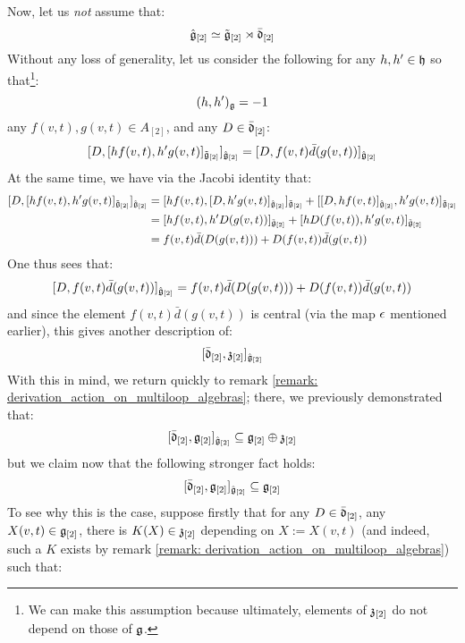 \begin{remark}
                Now, let us \textit{not} assume that:
                    $$\hat{\mathfrak{g}}_{[2]} \simeq \tilde{\mathfrak{g}}_{[2]}\rtimes \bar{\mathfrak{d}}_{[2]}$$
                Without any loss of generality, let us consider the following for any $h, h' \in \mathfrak{h}$ so that\footnote{We can make this assumption because ultimately, elements of $\mathfrak{z}_{[2]}$ do not depend on those of $\mathfrak{g}$.}:
                    $$(h, h')_{\mathfrak{g}} = -1$$
                any $f(v, t), g(v, t) \in A_{[2]}$, and any $D \in \bar{\mathfrak{d}}_{[2]}$:
                    $$[ D, [h f(v, t), h' g(v, t)]_{\tilde{\mathfrak{g}}_{[2]}} ]_{\hat{\mathfrak{g}}_{[2]}} = [ D, f(v, t) \bar{d}( g(v, t) ) ]_{\hat{\mathfrak{g}}_{[2]}}$$
                At the same time, we have via the Jacobi identity that:
                    $$
                        \begin{aligned}
                            [ D, [h f(v, t), h' g(v, t)]_{\tilde{\g}_{[2]}} ]_{\hat{\g}_{[2]}} & = [ h f(v, t), [D, h' g(v, t)]_{\hat{\g}_{[2]}} ]_{\tilde{\g}_{[2]}} + [ [D, h f(v, t)]_{\hat{\g}_{[2]}}, h' g(v, t) ]_{\tilde{\g}_{[2]}}
                            \\
                            & = [ h f(v, t), h' D( g(v, t) ) ]_{\tilde{\g}_{[2]}} + [ h D( f(v, t) ), h' g(v, t) ]_{\tilde{\g}_{[2]}}
                            \\
                            & = f(v, t) \bar{d}( D( g(v, t) ) ) + D( f(v, t) ) \bar{d}(g(v, t))
                        \end{aligned}
                    $$
                One thus sees that:
                    $$[ D, f(v, t) \bar{d}( g(v, t) ) ]_{\hat{\mathfrak{g}}_{[2]}} = f(v, t) \bar{d}( D( g(v, t) ) ) + D( f(v, t) ) \bar{d}(g(v, t))$$
                and since the element $f(v, t) \bar{d}( g(v, t) )$ is central (via the map $\epsilon$ mentioned earlier), this gives another description of:
                    $$[ \bar{\mathfrak{d}}_{[2]}, \mathfrak{z}_{[2]} ]_{\hat{\mathfrak{g}}_{[2]}}$$
                With this in mind, we return quickly to remark \ref{remark: derivation_action_on_multiloop_algebras}; there, we previously demonstrated that:
                    $$[ \bar{\mathfrak{d}}_{[2]}, \mathfrak{g}_{[2]} ]_{\hat{\mathfrak{g}}_{[2]}} \subseteq \mathfrak{g}_{[2]} \oplus \mathfrak{z}_{[2]}$$
                but we claim now that the following stronger fact holds:
                    $$[ \bar{\mathfrak{d}}_{[2]}, \mathfrak{g}_{[2]} ]_{\hat{\mathfrak{g}}_{[2]}} \subseteq \mathfrak{g}_{[2]}$$
                To see why this is the case, suppose firstly that for any $D \in \bar{\mathfrak{d}}_{[2]}$, any $X(v, t) \in \mathfrak{g}_{[2]}$, there is $K(X) \in \mathfrak{z}_{[2]}$ depending on $X := X(v, t)$ (and indeed, such a $K$ exists by remark \ref{remark: derivation_action_on_multiloop_algebras}) such that:

\end{remark}
